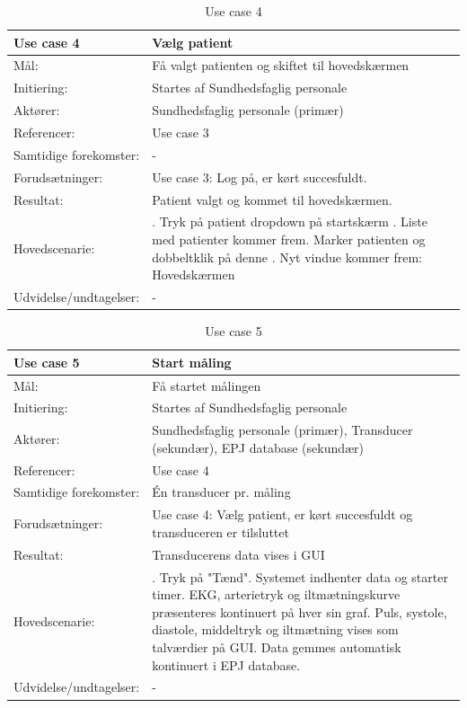 \begin{table}[H]
\caption{Use case 4}\label{tab:tabel3}
\begin{tabular}{| l | >{\raggedright\arraybackslash}p{11cm} |}
   \hline
   \textbf{Use case 4} & \textbf{Vælg patient}\\ \hline
   Mål: & Få valgt patienten og skiftet til hovedskærmen \\ \hline
   Initiering: & Startes af Sundhedsfaglig personale\\ \hline
   Aktører:& Sundhedsfaglig personale (primær)\\ \hline
   Referencer: & Use case 3 \\ \hline
   Samtidige forekomster: & - \\\hline
   Forudsætninger: & Use case 3: Log på, er kørt succesfuldt.\\ \hline
   Resultat:& Patient valgt og kommet til hovedskærmen.\\ \hline
   Hovedscenarie:& 
1. Tryk på patient dropdown på startskærm \newline
2. Liste med patienter kommer frem\newline
3. Marker patienten og dobbeltklik på denne \newline
3. Nyt vindue kommer frem: Hovedskærmen \\\hline
Udvidelse/undtagelser: & - \\\hline
\end{tabular}
\end{table}



\begin{table}[H]
\caption{Use case 5}\label{tab:tabel3}
\begin{tabular}{| l | >{\raggedright\arraybackslash}p{11cm} |}
   \hline
   \textbf{Use case 5} & \textbf{Start måling}\\ \hline
   Mål: & Få startet målingen \\ \hline
   Initiering: & Startes af Sundhedsfaglig personale\\ \hline
   Aktører:& Sundhedsfaglig personale (primær), Transducer (sekundær), EPJ database (sekundær) \\ \hline
   Referencer: & Use case 4\\ \hline
   Samtidige forekomster: & Én transducer pr. måling  \\\hline
   Forudsætninger: & Use case 4: Vælg patient, er kørt succesfuldt og transduceren er tilsluttet\\ \hline
   Resultat:& Transducerens data vises i GUI \\ \hline
   Hovedscenarie:& 
1. Tryk på "Tænd"\newline
2. Systemet indhenter data og starter timer\newline
3. EKG, arterietryk og iltmætningskurve præsenteres kontinuert på hver sin graf. Puls, systole, diastole, middeltryk og iltmætning vises som talværdier på GUI. Data gemmes automatisk kontinuert i EPJ database.\\\hline
Udvidelse/undtagelser: & - \\\hline
\end{tabular}
\end{table}


